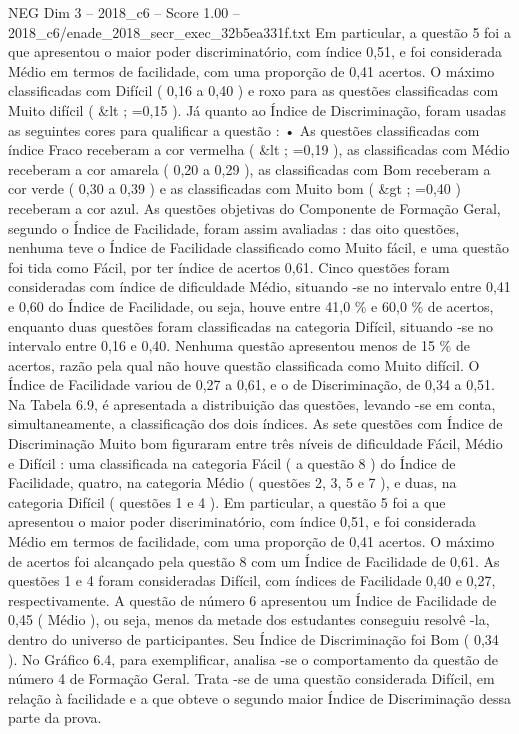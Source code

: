 \begin{textsample}{NEG Dim 3 – 2018\_c6 – Score 1.00 – 2018\_c6/enade\_2018\_secr\_exec\_32b5ea331f.txt}
Em particular, a questão 5 foi a que apresentou o maior poder discriminatório, com índice 0,51, e foi considerada Médio em termos de facilidade, com uma proporção de 0,41 acertos.
O máximo classificadas com Difícil ( 0,16 a 0,40 ) e roxo para as questões classificadas com Muito difícil ( \&lt ; =0,15 ).
Já quanto ao Índice de Discriminação, foram usadas as seguintes cores para qualificar a questão : • As questões classificadas com índice Fraco receberam a cor vermelha ( \&lt ; =0,19 ), as classificadas com Médio receberam a cor amarela ( 0,20 a 0,29 ), as classificadas com Bom receberam a cor verde ( 0,30 a 0,39 ) e as classificadas com Muito bom ( \&gt ; =0,40 ) receberam a cor azul.
As questões objetivas do Componente de Formação Geral, segundo o Índice de Facilidade, foram assim avaliadas : das oito questões, nenhuma teve o Índice de Facilidade classificado como Muito fácil, e uma questão foi tida como Fácil, por ter índice de acertos 0,61.
Cinco questões foram consideradas com índice de dificuldade Médio, situando -se no intervalo entre 0,41 e 0,60 do Índice de Facilidade, ou seja, houve entre 41,0 \% e 60,0 \% de acertos, enquanto duas questões foram classificadas na categoria Difícil, situando -se no intervalo entre 0,16 e 0,40.
Nenhuma questão apresentou menos de 15 \% de acertos, razão pela qual não houve questão classificada como Muito difícil.
O Índice de Facilidade variou de 0,27 a 0,61, e o de Discriminação, de 0,34 a 0,51.
Na Tabela 6.9, é apresentada a distribuição das questões, levando -se em conta, simultaneamente, a classificação dos dois índices.
As sete questões com Índice de Discriminação Muito bom figuraram entre três níveis de dificuldade Fácil, Médio e Difícil : uma classificada na categoria Fácil ( a questão 8 ) do Índice de Facilidade, quatro, na categoria Médio ( questões 2, 3, 5 e 7 ), e duas, na categoria Difícil ( questões 1 e 4 ).
Em particular, a questão 5 foi a que apresentou o maior poder discriminatório, com índice 0,51, e foi considerada Médio em termos de facilidade, com uma proporção de 0,41 acertos.
O máximo de acertos foi alcançado pela questão 8 com um Índice de Facilidade de 0,61.
As questões 1 e 4 foram consideradas Difícil, com índices de Facilidade 0,40 e 0,27, respectivamente.
A questão de número 6 apresentou um Índice de Facilidade de 0,45 ( Médio ), ou seja, menos da metade dos estudantes conseguiu resolvê -la, dentro do universo de participantes.
Seu Índice de Discriminação foi Bom ( 0,34 ).
No Gráfico 6.4, para exemplificar, analisa -se o comportamento da questão de número 4 de Formação Geral.
Trata -se de uma questão considerada Difícil, em relação à facilidade e a que obteve o segundo maior Índice de Discriminação dessa parte da prova.

\end{textsample}
